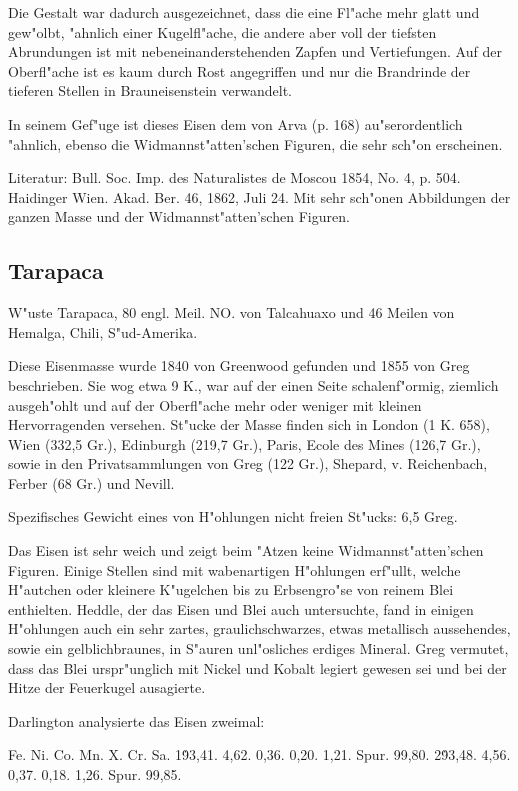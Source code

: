 \documentclass[a4paper, 11pt, oneside]{article}
\begin{document}
Die Gestalt war dadurch ausgezeichnet, dass die eine Fl"ache mehr glatt und gew"olbt, "ahnlich einer Kugelfl"ache, die andere aber voll der tiefsten Abrundungen ist mit nebeneinanderstehenden Zapfen und Vertiefungen. Auf der Oberfl"ache ist es kaum durch Rost angegriffen und nur die Brandrinde der tieferen Stellen in Brauneisenstein verwandelt.

In seinem Gef"uge ist dieses Eisen dem von Arva (p. 168) au"serordentlich "ahnlich, ebenso die Widmannst"atten'schen Figuren, die sehr sch"on erscheinen.

Literatur: Bull. Soc. Imp. des Naturalistes de Moscou 1854, No. 4, p. 504. Haidinger Wien. Akad. Ber. 46, 1862, Juli 24. Mit sehr sch"onen Abbildungen der ganzen Masse und der Widmannst"atten'schen Figuren.

\subsection{Tarapaca}

W"uste Tarapaca, 80 engl. Meil. NO. von Talcahuaxo und 46 Meilen von Hemalga, Chili, S"ud-Amerika.

Diese Eisenmasse wurde 1840 von Greenwood gefunden und 1855 von Greg beschrieben. Sie wog etwa 9 K., war auf der einen Seite schalenf"ormig, ziemlich ausgeh"ohlt und auf der Oberfl"ache mehr oder weniger mit kleinen Hervorragenden versehen. St"ucke der Masse finden sich in London (1 K. 658), Wien (332,5 Gr.), Edinburgh (219,7 Gr.), Paris, Ecole des Mines (126,7 Gr.), sowie in den Privatsammlungen von Greg (122 Gr.), Shepard, v. Reichenbach, Ferber (68 Gr.) und Nevill.

Spezifisches Gewicht eines von H"ohlungen nicht freien St"ucks: 6,5 Greg.

Das Eisen ist sehr weich und zeigt beim "Atzen keine Widmannst"atten'schen Figuren. Einige Stellen sind mit wabenartigen H"ohlungen erf"ullt, welche H"autchen oder kleinere K"ugelchen bis zu Erbsengro"se von reinem Blei enthielten. Heddle, der das Eisen und Blei auch untersuchte, fand in einigen H"ohlungen auch ein sehr zartes, graulichschwarzes, etwas metallisch aussehendes, sowie ein gelblichbraunes, in S"auren unl"osliches erdiges Mineral. Greg vermutet, dass das Blei urspr"unglich mit Nickel und Kobalt legiert gewesen sei und bei der Hitze der Feuerkugel ausagierte.

Darlington analysierte das Eisen zweimal:

Fe. Ni. Co. Mn. X. Cr. Sa.  
1\. 93,41. 4,62. 0,36. 0,20. 1,21. Spur. 99,80.  
2\. 93,48. 4,56. 0,37. 0,18. 1,26. Spur. 99,85.
\end{document}
